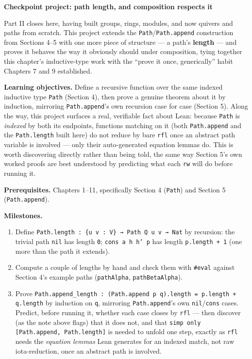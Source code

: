 \begin{pblproject}
\label{sec:11-path-algebras:07-checkpoint-project:1}
\textbf{\large Checkpoint project: path length, and composition respects it}\par\smallskip


Part II closes here, having built groups, rings, modules, and now quivers and paths from scratch. This project extends the \texttt{Path}/\texttt{Path.append} construction from Sections 4--5 with one more piece of structure --- a path's \textbf{length} --- and proves it behaves the way it obviously should under composition, tying together this chapter's inductive-type work with the ``prove it once, generically'' habit Chapters 7 and 9 established.

\textbf{Learning objectives.} Define a recursive function over the same indexed inductive type \texttt{Path} (Section 4), then prove a genuine theorem about it by induction, mirroring \texttt{Path.append}'s own recursion case for case (Section 5). Along the way, this project surfaces a real, verifiable fact about Lean: because \texttt{Path} is \emph{indexed} by both its endpoints, functions matching on it (both \texttt{Path.append} and the \texttt{Path.length} built here) do not reduce by bare \texttt{rfl} once an abstract path variable is involved --- only their auto-generated equation lemmas do. This is worth discovering directly rather than being told, the same way Section 5's own worked proofs are best understood by predicting what each \texttt{rw} will do before running it.

\textbf{Prerequisites.} Chapters 1--11, specifically Section 4 (\texttt{Path}) and Section 5 (\texttt{Path.append}).

\textbf{Milestones.}

\begin{enumerate}
\def\labelenumi{\arabic{enumi}.}
\tightlist
\item
  Define \texttt{Path.length : \{u v : V\} → Path Q u v → Nat} by recursion: the trivial path \texttt{nil} has length \texttt{0}; \texttt{cons a h h' p} has length \texttt{p.length + 1} (one more than the path it extends).
\item
  Compute a couple of lengths by hand and check them with \texttt{\#eval} against Section 4's example paths (\texttt{pathAlpha}, \texttt{pathBetaAlpha}).
\item
  Prove \texttt{Path.append\_\allowbreak{}length : (Path.append p q).length = p.length + q.length} by induction on \texttt{q}, mirroring \texttt{Path.append}'s own \texttt{nil}/\texttt{cons} cases. Predict, before running it, whether each case closes by \texttt{rfl} --- then discover (as the note above flags) that it does not, and that \texttt{simp only [Path.append, Path.length]} is needed to unfold one step, exactly as \texttt{rfl} needs the \emph{equation lemmas} Lean generates for an indexed match, not raw iota-reduction, once an abstract path is involved.
\end{enumerate}


\end{pblproject}

